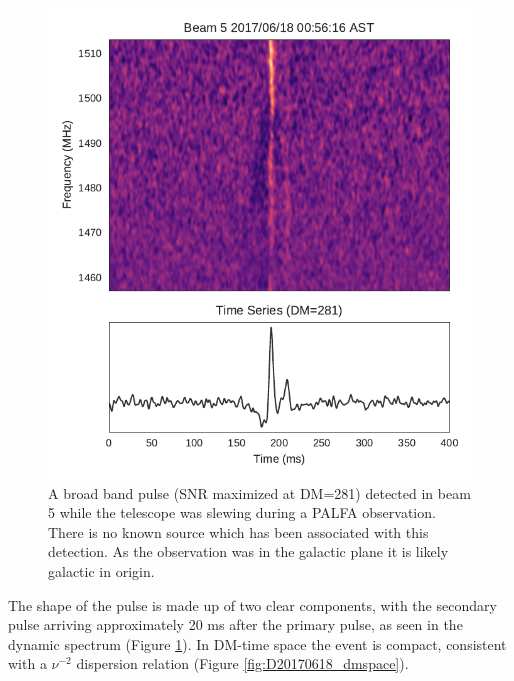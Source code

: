 \documentclass[a4paper,fleqn,usenatbib]{mnras}
\begin{document}
\begin{figure}
    \includegraphics[width=1.0\linewidth]{figures/Beam5_fb_D20170618T005616_buffer2_spectrum.pdf}
    \caption{A broad band pulse (SNR maximized at DM=281) detected in beam 5
    while the telescope was slewing during a PALFA observation. There is no
    known source which has been associated with this detection. As the
    observation was in the galactic plane it is likely galactic in origin.
    }
    \label{fig:D20170618_spectrum}
\end{figure}


The shape of the pulse is made up of two clear components, with the
secondary pulse arriving approximately 20 ms after the primary pulse,
as seen in the dynamic spectrum (Figure
\ref{fig:D20170618_spectrum}). In DM-time space the event is compact,
consistent with a $\nu^{-2}$ dispersion relation (Figure
\ref{fig:D20170618_dmspace}).
\end{document}
